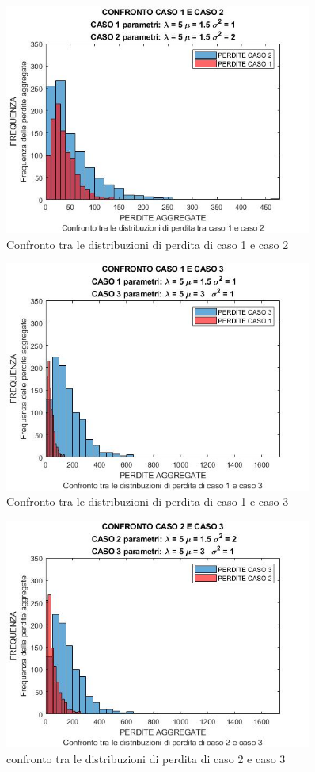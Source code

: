 \documentclass[titlepage]{article}
\begin{document}
\begin{itemize}
\begin{figure}[htbp]
	\centering
	\includegraphics[width=0.9\textwidth]{1VS2.jpg}
	\caption{\label{fig:losss.png}Confronto tra le distribuzioni di perdita di caso 1 e caso 2}
\end{figure}
\begin{figure}[htbp]
	\centering
	\includegraphics[width=0.9\textwidth]{1VS3.jpg}
	\caption{\label{fig:losss.png}Confronto tra le distribuzioni di perdita di caso 1 e caso 3}
\end{figure}
\begin{figure}[htbp]
	\centering
	\includegraphics[width=0.9\textwidth]{2VS3.jpg}
	\caption{\label{fig:losss.png}confronto tra le distribuzioni di perdita di caso 2 e caso 3}
\end{figure}

\end{itemize}
\end{document}
